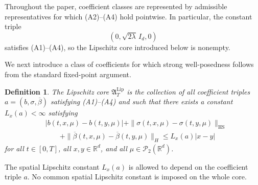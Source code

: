 \documentclass[12pt,oneside, reqno]{amsart}
\newtheorem{definition}[theorem]{Definition}
\numberwithin{equation}{section}
\begin{document}
	
	
	Throughout the paper, coefficient classes are represented by admissible representatives for which \textnormal{(A2)}--\textnormal{(A4)} hold pointwise. In particular, the constant triple
	\[
	(0,\sqrt{2\lambda}\,I_d,0)
	\]
	satisfies \textnormal{(A1)}--\textnormal{(A4)}, so the Lipschitz core introduced below is nonempty.
	
	
	
	We next introduce a class of coefficients for which strong well-posedness follows from the standard fixed-point argument.
	
	\begin{definition}
		\label{def:lipschitz-core}
		The Lipschitz core $\mathfrak A_T^{\mathrm{Lip}}$ is the collection	of all coefficient triples $a=(b,\sigma,\overline\beta)$ satisfying	\textnormal{(A1)}--\textnormal{(A4)} and such that there exists a	constant $L_x(a)<\infty$ satisfying
		\begin{equation}
			\label{eq:space-lipschitz-core}
			\begin{aligned}
				&|b(t,x,\mu)-b(t,y,\mu)|
				+\|\sigma(t,x,\mu)-\sigma(t,y,\mu)\|_{\mathrm{HS}}	\\
				&\qquad+\|\overline\beta(t,x,\mu)-\overline\beta(t,y,\mu)\|_H
				\leq L_x(a)|x-y|
			\end{aligned}
		\end{equation}
		for all $t\in[0,T]$, all $x,y\in\mathbb R^d$, and all $\mu\in\mathcal P_2(\mathbb R^d)$.
	\end{definition}
	
	The spatial Lipschitz constant $L_x(a)$ is allowed to depend on the coefficient triple $a$. No common spatial Lipschitz constant is imposed on the whole core. 
	
\end{document}
